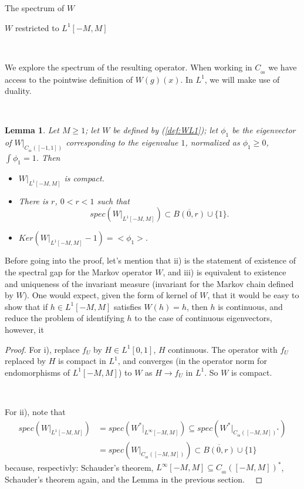 \documentclass[12pt]{article}
\newtheorem*{lmm}{Lemma}
\begin{document}
\begin{section}{The spectrum of $W$ }
\begin{subsection}{$W$ restricted to $L^1[-M,M]$ }
\

\

We explore the spectrum of the resulting operator. When working in $C_{_{0\!0}}$ we have access to the pointwise definition of $W(g)(x)$. In $L^1$, we will make use of duality. 
\ 

\

 


\begin{lmm} Let $M \ge 1$; let $W$ be defined by (\ref{def:WL1}); let $\phi_1$ be the eigenvector of $W\Big|_{C_{_{0\!0}}([-1,1])} $ corresponding to the eigenvalue $1$, normalized as $\phi_1 \ge 0$, $\int \phi_1 = 1$. Then 
	\begin{itemize}
		\item[i.] $W\Big|_{L^1[-M,M]}$ is compact.
		\item[ii.] There is $r$, $0 < r < 1$ such that
		$$
		spec(W\Big|_{L^1[-M,M]}) \subset \overline{B(0,r)} \cup \{1\}. 
		$$ 
		\item[iii.] $Ker(W\Big|_{L^1[-M,M]} - 1) = <\phi_1>.$
	\end{itemize}
\end{lmm}	

Before going into the proof, let's mention that ii) is the statement of existence of the spectral gap for the Markov operator $W$, and iii) is equivalent to existence and uniqueness of the invariant measure (invariant for the Markov chain defined by $W$). One would expect, given the form of kernel of $W$, that it would be easy to show that if $h \in L^1[-M,M]$ satisfies $W(h) = h$, then $h$ is continuous, and reduce the problem of identifying $h$ to the case of continuous eigenvectors, however, it   


\begin{proof}
	For i), replace $f_U$ by $H \in L^1[0,1]$, $H$ continuous. The operator with $f_U$ replaced by $H$ is compact in $L^1$, and converges (in the operator norm for endomorphisms of $L^1[-M,M]$) to $W$ as $H \longrightarrow f_U$ in $L^1$. So $W$ is compact.  
	\
	
	\
	
For ii), note that
\begin{align*}
spec(W\Big|_{L^1[-M,M]}) &= spec(W^* \Big|_{L^{\infty}[-M,M]}) \subseteq spec(W^* \Big|_{C_{_{00}}([-M,M])^*} ) \\
&= spec(W \Big|_{C_{_{00}}([-M,M])} ) \subset \overline{B(0,r)} \cup \{1\}
\end{align*}
because, respectivly: Schauder's theorem, $L^{\infty}[-M,M]  \subseteq C_{_{00}}([-M,M])^*$, Schauder's theorem again, and the Lemma in the previous section.  
\


\end{proof}
\end{subsection}
\end{section}
\end{document}

